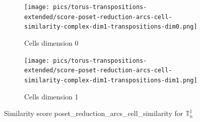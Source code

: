 \documentclass{article}
\begin{document}
\begin{figure}[htbp]
\centering
\begin{subfigure}[b]{0.45\textwidth}
    \texttt{[image: pics/torus-transpositions-extended/score-poset-reduction-arcs-cell-similarity-complex-dim1-transpositions-dim0.png]}
    \caption{Cells dimension 0}
    \label{fig:posetreductionarcscellsimilaritycomplex1cells0}
\end{subfigure}
\hfill
\begin{subfigure}[b]{0.45\textwidth}
    \texttt{[image: pics/torus-transpositions-extended/score-poset-reduction-arcs-cell-similarity-complex-dim1-transpositions-dim1.png]}
    \caption{Cells dimension 1}
    \label{fig:posetreductionarcscellsimilaritycomplex1cells1}
\end{subfigure}
\caption{Similarity score poset\_reduction\_arcs\_cell\_similarity for $\mathbb{T}_n^{1}$}
\label{fig:posetreductionarcscellsimilaritycomplex1}
\end{figure}
\end{document}
